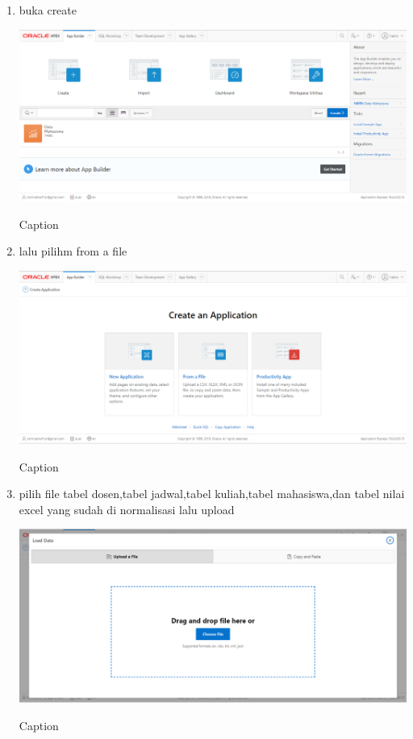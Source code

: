 ﻿\documentclass{article}
\begin{document}
\begin{enumerate}
    \item buka create
    \begin{center}
        \centering
        \includegraphics[scale=0.4]{figures/3.PNG}
        \caption{Caption}
        \label{fig:my_label}
    \end{center}

    \item lalu pilihm from a file
    \begin{center}
        \centering
        \includegraphics[scale=0.4]{figures/4.PNG}
        \caption{Caption}
        \label{fig:my_label}
    \end{center}

    \item pilih file tabel dosen,tabel jadwal,tabel kuliah,tabel mahasiswa,dan tabel nilai excel yang sudah di normalisasi lalu upload
    \begin{center}
        \centering
        \includegraphics[scale=0.4]{figures/5.PNG}
        \caption{Caption}
        \label{fig:my_label}
    \end{center}
    

\end{enumerate}
\end{document}
